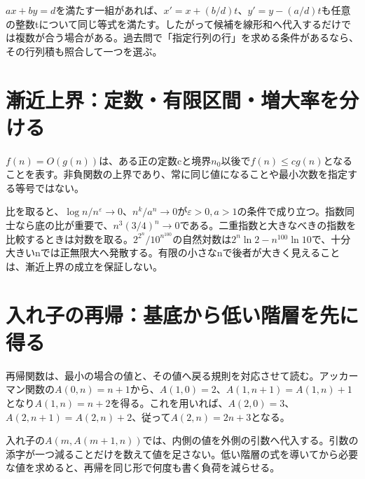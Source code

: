 \(ax+by=d\)を満たす一組があれば、\(x'=x+(b/d)t\)、\(y'=y-(a/d)t\)も任意の整数tについて同じ等式を満たす。したがって候補を線形和へ代入するだけでは複数が合う場合がある。過去問で「指定行列の行」を求める条件があるなら、その行列積も照合して一つを選ぶ。

\section{漸近上界：定数・有限区間・増大率を分ける}
\label{theory:discrete:asymptotic}
\(f(n)=O(g(n))\)は、ある正の定数cと境界\(n_0\)以後で\(f(n)\le cg(n)\)となることを表す。非負関数の上界であり、常に同じ値になることや最小次数を指定する等号ではない\parencite{mit_discrete2015}。

比を取ると、\(\log n/n^\varepsilon\to0\)、\(n^k/a^n\to0\)が\(\varepsilon>0,a>1\)の条件で成り立つ。指数同士なら底の比が重要で、\(n^3(3/4)^n\to0\)である。二重指数と大きなべきの指数を比較するときは対数を取る。\(2^{2^n}/10^{n^{100}}\)の自然対数は\(2^n\ln2-n^{100}\ln10\)で、十分大きいnでは正無限大へ発散する。有限の小さなnで後者が大きく見えることは、漸近上界の成立を保証しない。

\section{入れ子の再帰：基底から低い階層を先に得る}
\label{theory:discrete:recursion}
再帰関数は、最小の場合の値と、その値へ戻る規則を対応させて読む。アッカーマン関数の\(A(0,n)=n+1\)から、\(A(1,0)=2\)、\(A(1,n+1)=A(1,n)+1\)となり\(A(1,n)=n+2\)を得る。これを用いれば、\(A(2,0)=3\)、\(A(2,n+1)=A(2,n)+2\)、従って\(A(2,n)=2n+3\)となる。

入れ子の\(A(m,A(m+1,n))\)では、内側の値を外側の引数へ代入する。引数の添字が一つ減ることだけを数えて値を足さない。低い階層の式を導いてから必要な値を求めると、再帰を同じ形で何度も書く負荷を減らせる。
